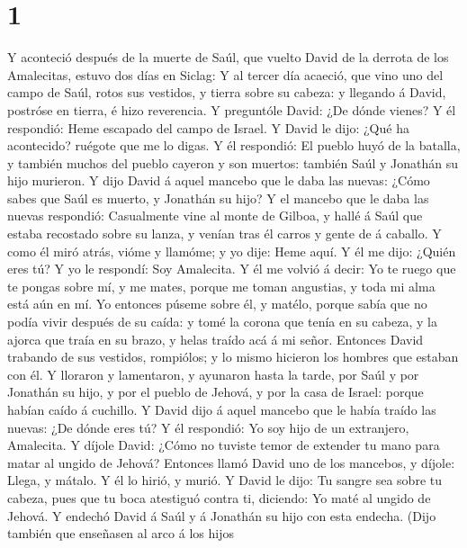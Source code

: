 \hypertarget{section}{%
\section{1}\label{section}}

 Y aconteció después de la muerte de Saúl, que vuelto
David de la derrota de los Amalecitas, estuvo dos días en Siclag:
 Y al tercer día acaeció, que vino uno del campo de Saúl,
rotos sus vestidos, y tierra sobre su cabeza: y llegando á David,
postróse en tierra, é hizo reverencia.  Y preguntóle
David: ¿De dónde vienes? Y él respondió: Heme escapado del campo de
Israel.  Y David le dijo: ¿Qué ha acontecido? ruégote que
me lo digas. Y él respondió: El pueblo huyó de la batalla, y también
muchos del pueblo cayeron y son muertos: también Saúl y Jonathán su hijo
murieron.  Y dijo David á aquel mancebo que le daba las
nuevas: ¿Cómo sabes que Saúl es muerto, y Jonathán su hijo?
 Y el mancebo que le daba las nuevas respondió:
Casualmente vine al monte de Gilboa, y hallé á Saúl que estaba recostado
sobre su lanza, y venían tras él carros y gente de á caballo.
 Y como él miró atrás, vióme y llamóme; y yo dije: Heme
aquí.  Y él me dijo: ¿Quién eres tú? Y yo le respondí: Soy
Amalecita.  Y él me volvió á decir: Yo te ruego que te
pongas sobre mí, y me mates, porque me toman angustias, y toda mi alma
está aún en mí.  Yo entonces púseme sobre él, y matélo,
porque sabía que no podía vivir después de su caída: y tomé la corona
que tenía en su cabeza, y la ajorca que traía en su brazo, y helas
traído acá á mi señor.  Entonces David trabando de sus
vestidos, rompiólos; y lo mismo hicieron los hombres que estaban con él.
 Y lloraron y lamentaron, y ayunaron hasta la tarde, por
Saúl y por Jonathán su hijo, y por el pueblo de Jehová, y por la casa de
Israel: porque habían caído á cuchillo.  Y David dijo á
aquel mancebo que le había traído las nuevas: ¿De dónde eres tú? Y él
respondió: Yo soy hijo de un extranjero, Amalecita.  Y
díjole David: ¿Cómo no tuviste temor de extender tu mano para matar al
ungido de Jehová?  Entonces llamó David uno de los
mancebos, y díjole: Llega, y mátalo. Y él lo hirió, y murió.
 Y David le dijo: Tu sangre sea sobre tu cabeza, pues que
tu boca atestiguó contra ti, diciendo: Yo maté al ungido de Jehová.
 Y endechó David á Saúl y á Jonathán su hijo con esta
endecha.  (Dijo también que enseñasen al arco á los hijos
